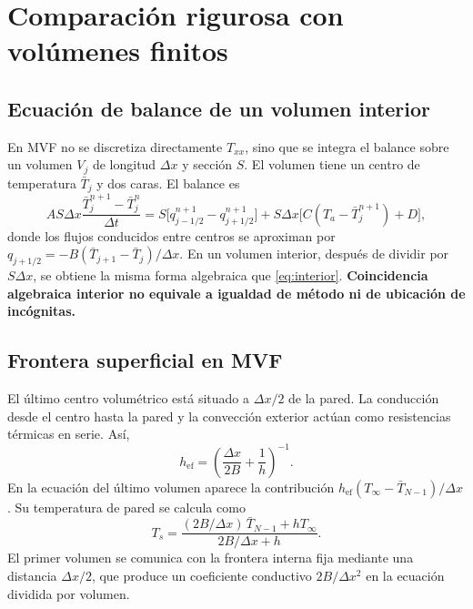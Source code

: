 \documentclass[11pt,a4paper]{article}
\begin{document}
\section{Comparación rigurosa con volúmenes finitos}
\subsection{Ecuación de balance de un volumen interior}
En MVF no se discretiza directamente $T_{xx}$, sino que se integra el balance sobre un volumen $V_j$ de longitud $\Delta x$ y sección $S$. El volumen tiene un centro de temperatura $\bar T_j$ y dos caras. El balance es
\begin{equation}
A S\Delta x\frac{\bar T_j^{n+1}-\bar T_j^n}{\Delta t}
= S\bigl[q_{j-1/2}^{n+1}-q_{j+1/2}^{n+1}\bigr]
+ S\Delta x\bigl[C(T_a-\bar T_j^{n+1})+D\bigr],
\end{equation}
donde los flujos conducidos entre centros se aproximan por $q_{j+1/2}=-B(\bar T_{j+1}-\bar T_j)/\Delta x$. En un volumen interior, después de dividir por $S\Delta x$, se obtiene la misma forma algebraica que \eqref{eq:interior}. \textbf{Coincidencia algebraica interior no equivale a igualdad de método ni de ubicación de incógnitas.}

\subsection{Frontera superficial en MVF}
El último centro volumétrico está situado a $\Delta x/2$ de la pared. La conducción desde el centro hasta la pared y la convección exterior actúan como resistencias térmicas en serie. Así,
\begin{equation}\label{eq:heff}
 h_{\mathrm{ef}}=\left(\frac{\Delta x}{2B}+\frac{1}{h}\right)^{-1}.
\end{equation}
En la ecuación del último volumen aparece la contribución $h_{\mathrm{ef}}(T_\infty-\bar T_{N-1})/\Delta x$. Su temperatura de pared se calcula como
\begin{equation}\label{eq:wall}
T_s=\frac{(2B/\Delta x)\,\bar T_{N-1}+hT_\infty}{2B/\Delta x+h}.
\end{equation}
El primer volumen se comunica con la frontera interna fija mediante una distancia $\Delta x/2$, que produce un coeficiente conductivo $2B/\Delta x^2$ en la ecuación dividida por volumen.
\end{document}
